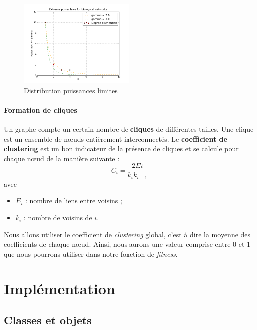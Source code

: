 \begin{figure}
  \vspace{-30pt}
  \begin{center}
    \includegraphics[width=0.50\textwidth]{Plot.png}
  \end{center}
  \caption{Distribution puissances limites}
  \label{scalefree}
\end{figure}
\paragraph*{Formation de cliques\\}

Un graphe compte un certain nombre de \textbf{cliques} de différentes tailles. Une clique est un ensemble de nœuds entièrement interconnectés. Le \textbf{coefficient de clustering} est un bon indicateur de la présence de cliques et se calcule pour chaque nœud de la manière suivante :
$$ C_i = \frac{2Ei}{k_i k_{i-1}} $$
avec
\begin{itemize}
 \item $E_i$ : nombre de liens entre voisins ;
 \item $k_i$ : nombre de voisins de $i$.
\end{itemize}
Nous allons utiliser le coefficient de \textit{clustering} global, c'est à dire la moyenne des coefficients de chaque nœud. Ainsi, nous aurons une valeur comprise entre $0$ et $1$ que nous pourrons utiliser dans notre fonction de \textit{fitness}.



\section{Implémentation}

\subsection{Classes et objets}

